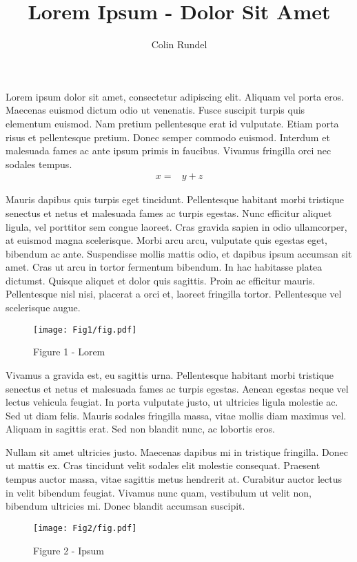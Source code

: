 \documentclass[11pt]{amsart}
\title{Lorem Ipsum - Dolor Sit Amet}
\author{Colin Rundel}
\date{}
\begin{document}
\maketitle

Lorem ipsum dolor sit amet, consectetur adipiscing elit. Aliquam vel porta eros. Maecenas euismod dictum odio ut venenatis. Fusce suscipit turpis quis elementum euismod. Nam pretium pellentesque erat id vulputate. Etiam porta risus et pellentesque pretium. Donec semper commodo euismod. Interdum et malesuada fames ac ante ipsum primis in faucibus. Vivamus fringilla orci nec sodales tempus.
%
\begin{align}
x =& y + z
\end{align}

Mauris dapibus quis turpis eget tincidunt. Pellentesque habitant morbi tristique senectus et netus et malesuada fames ac turpis egestas. Nunc efficitur aliquet ligula, vel porttitor sem congue laoreet. Cras gravida sapien in odio ullamcorper, at euismod magna scelerisque. Morbi arcu arcu, vulputate quis egestas eget, bibendum ac ante. Suspendisse mollis mattis odio, et dapibus ipsum accumsan sit amet. Cras ut arcu in tortor fermentum bibendum. In hac habitasse platea dictumst. Quisque aliquet et dolor quis sagittis. Proin ac efficitur mauris. Pellentesque nisl nisi, placerat a orci et, laoreet fringilla tortor. Pellentesque vel scelerisque augue.

\begin{figure}[htbp]
   \centering
   \texttt{[image: Fig1/fig.pdf]}
   \caption{Figure 1 - Lorem}
   \label{fig:fig1}
\end{figure}

Vivamus a gravida est, eu sagittis urna. Pellentesque habitant morbi tristique senectus et netus et malesuada fames ac turpis egestas. Aenean egestas neque vel lectus vehicula feugiat. In porta vulputate justo, ut ultricies ligula molestie ac. Sed ut diam felis. Mauris sodales fringilla massa, vitae mollis diam maximus vel. Aliquam in sagittis erat. Sed non blandit nunc, ac lobortis eros.

Nullam sit amet ultricies justo. Maecenas dapibus mi in tristique fringilla. Donec ut mattis ex. Cras tincidunt velit sodales elit molestie consequat. Praesent tempus auctor massa, vitae sagittis metus hendrerit at. Curabitur auctor lectus in velit bibendum feugiat. Vivamus nunc quam, vestibulum ut velit non, bibendum ultricies mi. Donec blandit accumsan suscipit.

\begin{figure}[htbp]
   \centering
   \texttt{[image: Fig2/fig.pdf]}
   \caption{Figure 2 - Ipsum}
   \label{fig:fig2}
\end{figure}
\end{document}
